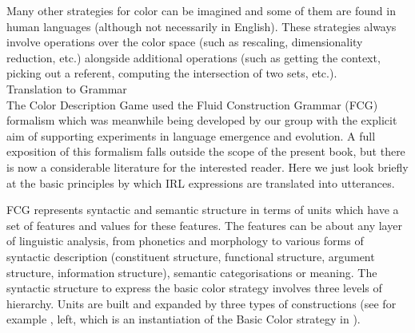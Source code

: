 Many other strategies for color can be imagined and some of them are found in human languages (although not necessarily in English). 
These strategies always involve operations over the color space (such as rescaling, dimensionality reduction, etc.) alongside 
additional operations (such as getting the context, picking out a referent, computing the intersection of two sets, etc.). \\

{\bfshape Translation to Grammar} \\

The Color Description Game used the Fluid Construction Grammar (FCG) formalism which was meanwhile being developed by our 
group with the explicit aim of supporting experiments in language emergence and evolution. A full exposition of this 
formalism falls outside the scope of the present book, but there is now a considerable literature for the interested 
reader.\cite{Steels:2011} Here we just look briefly at the basic principles by which IRL 
expressions are translated into utterances. 

FCG represents syntactic and semantic structure in terms of units which have a set of features and values for these 
features. The features can be about any layer of linguistic analysis, from phonetics and morphology to various 
forms of syntactic description (constituent structure, functional structure, argument structure, information structure), 
semantic categorisations or meaning. 
The syntactic structure to express the basic color strategy involves three levels of hierarchy. Units are built 
and expanded by three types of constructions (see for example , left, which is an instantiation of 
the Basic Color strategy in ). 

